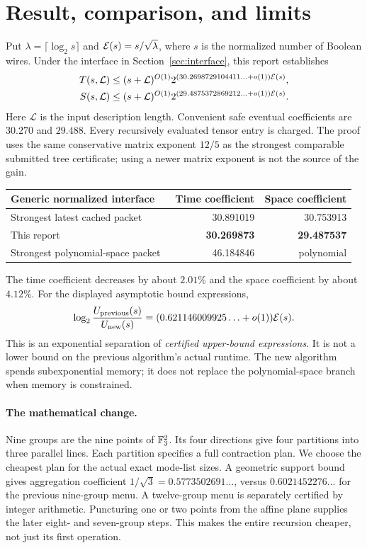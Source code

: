 \section{Result, comparison, and limits}
\label{sec:result}

Put $\lambda=\lceil\log_2s\rceil$ and $\mathcal E(s)=s/\sqrt\lambda$, where
$s$ is the normalized number of Boolean wires. Under the interface in
Section~\ref{sec:interface}, this report establishes
\begin{align}
 T(s,\mathcal L)&\le (s+\mathcal L)^{O(1)}
       2^{(30.2698729104411\ldots+o(1))\mathcal E(s)},\label{eq:headline-time}\\
 S(s,\mathcal L)&\le (s+\mathcal L)^{O(1)}
       2^{(29.4875372869212\ldots+o(1))\mathcal E(s)}.\label{eq:headline-space}
\end{align}
Here $\mathcal L$ is the input description length. Convenient safe eventual
coefficients are $30.270$ and $29.488$. Every recursively evaluated tensor
entry is charged. The proof uses the same conservative matrix exponent
$12/5$ as the strongest comparable submitted tree certificate; using a newer
matrix exponent is not the source of the gain.

\begin{center}
\begin{tabular}{p{7.4cm}rr}
\toprule Generic normalized interface & Time coefficient & Space coefficient\\\midrule
Strongest latest cached packet~\cite{tree} &30.891019&30.753913\\
This report &\textbf{30.269873}&\textbf{29.487537}\\
Strongest polynomial-space packet~\cite{flags} &46.184846&polynomial\\
\bottomrule
\end{tabular}
\end{center}
The time coefficient decreases by about $2.01\%$ and the space coefficient
by about $4.12\%$. For the displayed asymptotic bound expressions,
\[
 \log_2\frac{U_{\rm previous}(s)}{U_{\rm new}(s)}
  =(0.621146009925\ldots+o(1))\mathcal E(s).
\]
This is an exponential separation of \emph{certified upper-bound expressions}.
It is not a lower bound on the previous algorithm's actual runtime.
The new algorithm spends subexponential memory; it does not replace the
polynomial-space branch when memory is constrained.

\paragraph{The mathematical change.}
Nine groups are the nine points of $\mathbb F_3^2$. Its four directions give four
partitions into three parallel lines. Each partition specifies a full
contraction plan. We choose the cheapest plan for the actual exact mode-list
sizes. A geometric support bound gives aggregation coefficient
$1/\sqrt3=0.5773502691\ldots$, versus $0.6021452276\ldots$ for the previous
nine-group menu. A twelve-group menu is separately certified by integer
arithmetic. Puncturing one or two points from the affine plane supplies the
later eight- and seven-group steps. This makes the entire recursion cheaper,
not just its first operation.


